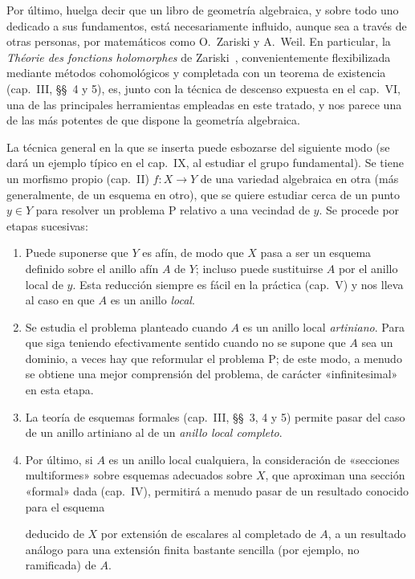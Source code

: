 Por último, huelga decir que un libro de geometría algebraica, y sobre todo uno dedicado a sus fundamentos, está necesariamente influido, aunque sea a través de otras personas, por matemáticos como O.~Zariski y A.~Weil.
En particular, la \emph{Théorie des fonctions holomorphes} de Zariski~\cite{I-20}, convenientemente flexibilizada mediante métodos cohomológicos y completada con un teorema de existencia (cap.~III, \S\S~4 y 5), es, junto con la técnica de descenso expuesta en el cap.~VI, una de las principales herramientas empleadas en este tratado, y nos parece una de las más potentes de que dispone la geometría algebraica.

La técnica general en la que se inserta puede esbozarse del siguiente modo (se dará un ejemplo típico en el cap.~IX, al estudiar el grupo fundamental).
Se tiene un morfismo propio (cap.~II) $f:X\to Y$ de una variedad algebraica en otra (más generalmente, de un esquema en otro), que se quiere estudiar cerca de un punto $y\in Y$ para resolver un problema P relativo a una vecindad de $y$.
Se procede por etapas sucesivas:
\begin{enumerate}
  \item[$1^\circ$] Puede suponerse que $Y$ es afín, de modo que $X$ pasa a ser un esquema definido sobre el anillo afín $A$ de $Y$; incluso puede sustituirse $A$ por el anillo local de $y$.
  Esta reducción siempre es fácil en la práctica (cap.~V) y nos lleva al caso en que $A$ es un anillo \emph{local}.
  \item[$2^\circ$] Se estudia el problema planteado cuando $A$ es un anillo local \emph{artiniano}.
  Para que siga teniendo efectivamente sentido cuando no se supone que $A$ sea un dominio, a veces hay que reformular el problema P; de este modo, a menudo se obtiene una mejor comprensión del problema, de carácter «infinitesimal» en esta etapa.
  \item[$3^\circ$] La teoría de esquemas formales (cap.~III, \S\S~3, 4 y 5) permite pasar del caso de un anillo artiniano al de un \emph{anillo local completo}.
  \item[$4^\circ$] Por último, si $A$ es un anillo local cualquiera, la consideración de «secciones multiformes» sobre esquemas adecuados sobre $X$, que aproximan una sección «formal» dada (cap.~IV), permitirá a menudo pasar de un resultado conocido para el esquema

  deducido de $X$ por extensión de escalares al completado de $A$, a un resultado análogo para una extensión finita bastante sencilla (por ejemplo, no ramificada) de $A$.
\end{enumerate}

